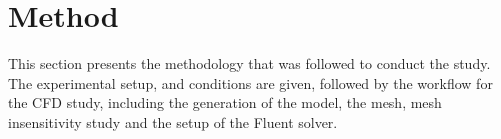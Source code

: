 \documentclass[11pt,a4paper,twoside,oneside]{article}
\begin{document}









\clearpage
\thispagestyle{empty}

\cleardoublepage

\thispagestyle{plain}

\section{Method}\label{sec:method}
\vspace{.6cm}
This section presents the methodology that was followed to conduct the study. The experimental setup, and conditions are given, followed by the workflow for the CFD study, including the generation of the model, the mesh, mesh insensitivity study and the setup of the Fluent solver.
\end{document}
